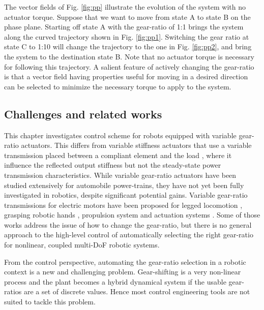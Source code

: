 The vector fields of Fig. \ref{fig:pp} illustrate the evolution of the system with no actuator torque. Suppose that we want to move from state A to state B on the phase plane. Starting off state A with the gear-ratio of 1:1 brings the system along the curved trajectory shown in Fig. \ref{fig:pp1}. Switching the gear ratio at state C to 1:10 will change the trajectory to the one in Fig. \ref{fig:pp2}, and bring the system to the destination state B. Note that no actuator torque is necessary for following this trajectory. A salient feature of actively changing the gear-ratio is that a vector field having properties useful for moving in a desired direction can be selected to minimize the necessary torque to apply to the system. 


\subsection{Challenges and related works}
\label{sec:chal}

This chapter investigates control scheme for robots equipped with variable gear-ratio actuators. This differs from variable stiffness actuators that use a variable transmission placed between a compliant element and the load \cite{vanderborght_variable_2013}, where it influence the reflected output stiffness but not the steady-state power transmission characteristics. While variable gear-ratio actuators have been studied extensively for automobile power-trains, they have not yet been fully investigated in robotics, despite significant potential gains. Variable gear-ratio transmissions for electric motors have been proposed for legged locomotion \cite{hirose_design_1991}, grasping robotic hands \cite{shin_robot_2012} , propulsion system \cite{lee_new_2012} \cite{mckeegan_antonovs_2011} and actuation systems \cite{girard_two-speed_2015} \cite{hirose_development_1999} \cite{tahara_high-backdrivable_2011}. Some of those works address the issue of how to change the gear-ratio, but there is no general approach to the high-level control of automatically selecting the right gear-ratio for nonlinear, coupled multi-DoF robotic systems.


From the control perspective, automating the gear-ratio selection in a robotic context is a new and challenging problem. Gear-shifting is a very non-linear process and the plant becomes a hybrid dynamical system if the usable gear-ratios are a set of discrete values. Hence most control engineering tools are not suited to tackle this problem. 

